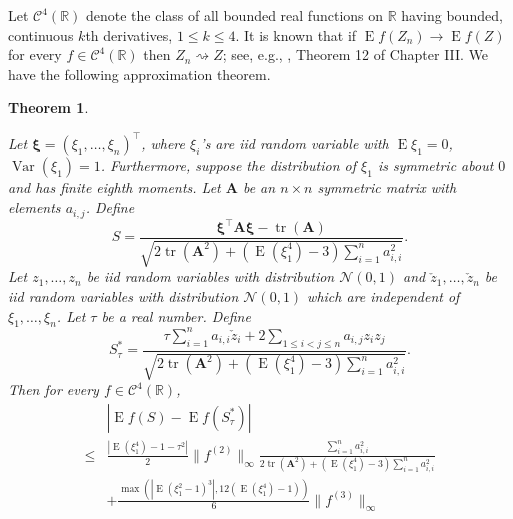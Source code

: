 \documentclass[11pt]{article}
\DeclareMathOperator{\mytr}{tr}
\DeclareMathOperator{\myE}{E}
\DeclareMathOperator{\myVar}{Var}
\newcommand{\BA}{\mathbf{A}}    \newcommand{\BB}{\mathbf{B}}    \newcommand{\BC}{\mathbf{C}}    \newcommand{\BD}{\mathbf{D}}    \newcommand{\BE}{\mathbf{E}}    \newcommand{\BF}{\mathbf{F}}    \newcommand{\BG}{\mathbf{G}}    \newcommand{\BH}{\mathbf{H}}    \newcommand{\BI}{\mathbf{I}}    \newcommand{\BJ}{\mathbf{J}}    \newcommand{\BK}{\mathbf{K}}    \newcommand{\BL}{\mathbf{L}}
\newcommand{\bfsym}[1]{\ensuremath{\boldsymbol{#1}}}
\def\bxi{\bfsym {\xi}}
\theoremstyle{plain}
\newtheorem{theorem}{\quad\quad Theorem}
\theoremstyle{definition}
\theoremstyle{remark}
\begin{document}
Let $\mathscr C^4(\mathbb R)$ denote the class of all bounded real functions on $\mathbb R$ having bounded, continuous $k$th derivatives, $1\leq k\leq 4$.
It is known that if $\myE f(Z_n)\to \myE f(Z)$ for every $f\in \mathscr C^4 (\mathbb R)$ then $Z_n \rightsquigarrow Z$; see, e.g., \cite{pollard1984convergence}, Theorem 12 of Chapter III.
We have the following approximation theorem.


\begin{theorem}\label{TheoremLindeberg}

    Let $\bxi=(\xi_1,\ldots,\xi_n)^\top$, where $\xi_i$'s are iid random variable with $\myE \xi_1=0$, $\myVar (\xi_1)=1$.
    Furthermore, suppose the distribution of  $\xi_1$ is symmetric about $0$ and has finite eighth moments.
    Let $\BA$ be an $n\times n$ symmetric matrix with elements $a_{i,j}$.
Define
    \begin{equation*}
        S=\frac{
            \bxi^\top \BA \bxi-\mytr (\BA)
        }{
            \sqrt{
    2 \mytr(\BA^2)
    +
    (\myE (\xi_1^4)-3)\sum_{i=1}^n a_{i,i}^2
            }             
        }.
    \end{equation*}
    Let $z_1,\ldots,z_n$  be iid random variables with distribution $\mathcal N (0, 1) $ and $\check z_1, \ldots, \check z_n$ be iid random variables with distribution $\mathcal N (0,1)$ which are independent of $\xi_1,\ldots, \xi_n$.
    Let $\tau$ be a real number.
    Define
    \begin{equation*}
        S_\tau^* =
        \frac{
            \tau \sum_{i=1}^n  a_{i,i}\check z_i
        +2\sum_{1\leq i <j \leq n} a_{i,j} z_i z_j
    }
    {
            \sqrt{
    2 \mytr(\BA^2)
    +
    (\myE (\xi_1^4)-3) \sum_{i=1}^n a_{i,i}^2
            }             
        }.
    \end{equation*}
    Then for every $f\in \mathscr C^4(\mathbb R)$,
    \begin{equation}\label{eq:longInequality}
        \begin{split}
             &
              \left| \myE f(S)-\myE f(S_\tau^*)\right|
             \\
\leq&
\frac{
\left|
\myE (\xi_1^4)-1
            -
            \tau^2
\right|
}{2}
\|f^{(2)}\|_\infty
\frac{
    \sum_{i=1}^n a_{i,i}^2
}{
    2 \mytr(\BA^2)
    +
    (\myE (\xi_1^4)-3) \sum_{i=1}^n a_{i,i}^2
}
\\
&
            +
            \frac{
            \max\left(
    \left|\myE (\xi_1^2-1)^3\right|
            ,
12 (\myE (\xi_1^4)-1)
        \right)
            }{6} \|f^{(3)}\|_\infty

\end{split}
\end{equation}
\end{theorem}
\end{document}
